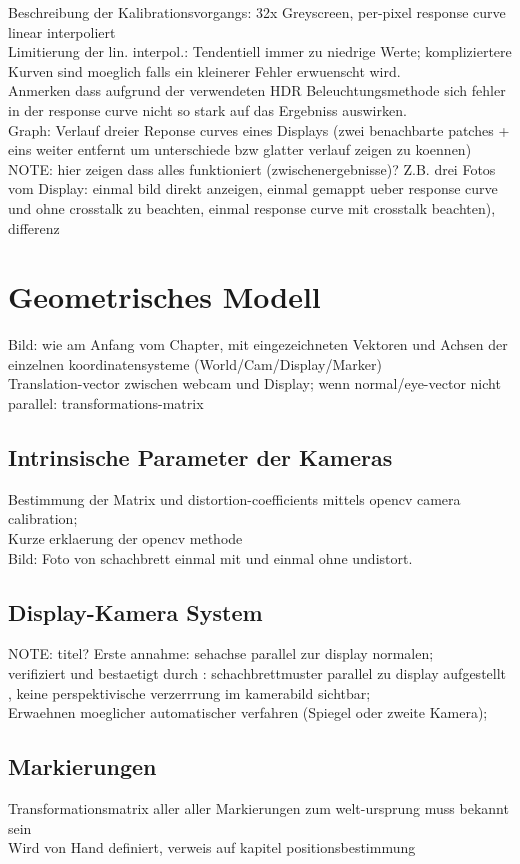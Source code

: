   Beschreibung der Kalibrationsvorgangs: 32x Greyscreen, per-pixel response curve linear interpoliert  \\
  Limitierung der lin. interpol.: Tendentiell immer zu niedrige Werte; kompliziertere Kurven sind moeglich falls ein kleinerer Fehler erwuenscht wird.  \\
  Anmerken dass aufgrund der verwendeten HDR Beleuchtungsmethode sich fehler in der response curve nicht so stark auf das Ergebniss auswirken.\\  
  Graph: Verlauf dreier Reponse curves eines Displays (zwei benachbarte patches + eins weiter entfernt um unterschiede bzw glatter verlauf zeigen zu koennen)\\
 NOTE: hier  zeigen dass alles funktioniert (zwischenergebnisse)? Z.B. drei Fotos vom Display: einmal bild direkt anzeigen, einmal gemappt ueber response curve und ohne crosstalk zu beachten, einmal response curve mit crosstalk beachten), differenz
 

\section{Geometrisches Modell}
 Bild: wie am Anfang vom Chapter, mit eingezeichneten Vektoren und Achsen der einzelnen koordinatensysteme  (World/Cam/Display/Marker)\\
  Translation-vector zwischen webcam und Display; wenn normal/eye-vector nicht parallel: transformations-matrix\\
 
\subsection{Intrinsische Parameter der Kameras}
  Bestimmung der Matrix und distortion-coefficients mittels opencv camera calibration; \\
  Kurze erklaerung der opencv methode\\
  Bild: Foto von schachbrett einmal mit und einmal ohne undistort.

\subsection{Display-Kamera System}
 NOTE: titel?
 Erste annahme: sehachse parallel zur display normalen; \\
 verifiziert und bestaetigt durch : schachbrettmuster parallel zu display aufgestellt , keine perspektivische verzerrrung im kamerabild sichtbar; \\
  Erwaehnen moeglicher automatischer verfahren (Spiegel oder zweite Kamera);\\

\subsection{Markierungen}
  Transformationsmatrix aller aller Markierungen zum welt-ursprung muss bekannt sein\\
  Wird von Hand definiert, verweis auf kapitel positionsbestimmung\\

    

    
  
